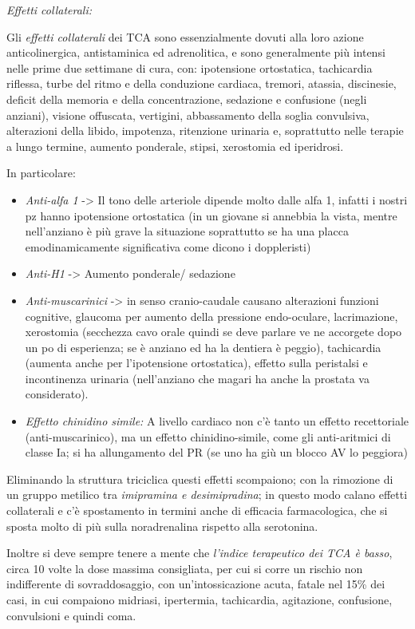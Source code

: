 \begin{itemize}
\begin{itemize}
\emph{\emph{Effetti collaterali:}}

Gli \emph{effetti collaterali} dei TCA sono essenzialmente dovuti alla
loro azione anticolinergica, antistaminica ed adrenolitica, e sono
generalmente più intensi nelle prime due settimane di cura, con:
ipotensione ortostatica, tachicardia riflessa, turbe del ritmo e della
conduzione cardiaca, tremori, atassia, discinesie, deficit della memoria
e della concentrazione, sedazione e confusione (negli anziani), visione
offuscata, vertigini, abbassamento della soglia convulsiva, alterazioni
della libido, impotenza, ritenzione urinaria e, soprattutto nelle
terapie a lungo termine, aumento ponderale, stipsi, xerostomia ed
iperidrosi.

In particolare:

\begin{itemize}
\item
  \emph{Anti-alfa 1} -> Il tono delle arteriole dipende molto dalle alfa
  1, infatti i nostri pz hanno ipotensione ortostatica (in un giovane si
  annebbia la vista, mentre nell'anziano è più grave la situazione
  soprattutto se ha una placca emodinamicamente significativa come
  dicono i doppleristi)
\item
  \emph{Anti-H1} -> Aumento ponderale/ sedazione
\item
  \emph{Anti-muscarinici} -> in senso cranio-caudale causano alterazioni
  funzioni cognitive, glaucoma per aumento della pressione endo-oculare,
  lacrimazione, xerostomia (secchezza cavo orale quindi se deve parlare
  ve ne accorgete dopo un po di esperienza; se è anziano ed ha la
  dentiera è peggio), tachicardia (aumenta anche per l'ipotensione
  ortostatica), effetto sulla peristalsi e incontinenza urinaria
  (nell'anziano che magari ha anche la prostata va considerato).
\item
  \emph{Effetto chinidino simile:} A livello cardiaco non c'è tanto un
  effetto recettoriale (anti-muscarinico), ma un effetto
  chinidino-simile, come gli anti-aritmici di classe Ia; si ha
  allungamento del PR (se uno ha giù un blocco AV lo peggiora)
\end{itemize}

Eliminando la struttura triciclica questi effetti scompaiono; con la
rimozione di un gruppo metilico tra \emph{imipramina e desimipradina};
in questo modo calano effetti collaterali e c'è spostamento in termini
anche di efficacia farmacologica, che si sposta molto di più sulla
noradrenalina rispetto alla serotonina.

Inoltre si deve sempre tenere a mente che \emph{l'indice terapeutico dei
TCA è basso}, circa 10 volte la dose massima consigliata, per cui si
corre un rischio non indifferente di sovraddosaggio, con
un'intossicazione acuta, fatale nel 15\% dei casi, in cui compaiono
midriasi, ipertermia, tachicardia, agitazione, confusione, convulsioni e
quindi coma.


\end{itemize}
\end{itemize}
